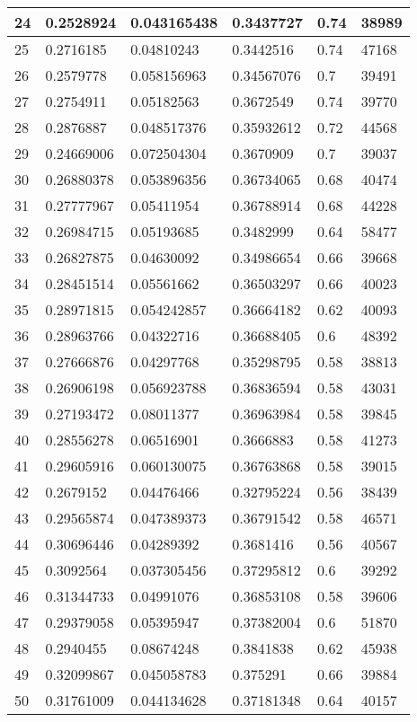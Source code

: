 \begin{longtable}{|l|l|l|l|l|l|}
24 & 0.2528924 & 0.043165438 & 0.3437727 & 0.74 & 38989 \\ \hline 
25 & 0.2716185 & 0.04810243 & 0.3442516 & 0.74 & 47168 \\ \hline 
26 & 0.2579778 & 0.058156963 & 0.34567076 & 0.7 & 39491 \\ \hline 
27 & 0.2754911 & 0.05182563 & 0.3672549 & 0.74 & 39770 \\ \hline 
28 & 0.2876887 & 0.048517376 & 0.35932612 & 0.72 & 44568 \\ \hline 
29 & 0.24669006 & 0.072504304 & 0.3670909 & 0.7 & 39037 \\ \hline 
30 & 0.26880378 & 0.053896356 & 0.36734065 & 0.68 & 40474 \\ \hline 
31 & 0.27777967 & 0.05411954 & 0.36788914 & 0.68 & 44228 \\ \hline 
32 & 0.26984715 & 0.05193685 & 0.3482999 & 0.64 & 58477 \\ \hline 
33 & 0.26827875 & 0.04630092 & 0.34986654 & 0.66 & 39668 \\ \hline 
34 & 0.28451514 & 0.05561662 & 0.36503297 & 0.66 & 40023 \\ \hline 
35 & 0.28971815 & 0.054242857 & 0.36664182 & 0.62 & 40093 \\ \hline 
36 & 0.28963766 & 0.04322716 & 0.36688405 & 0.6 & 48392 \\ \hline 
37 & 0.27666876 & 0.04297768 & 0.35298795 & 0.58 & 38813 \\ \hline 
38 & 0.26906198 & 0.056923788 & 0.36836594 & 0.58 & 43031 \\ \hline 
39 & 0.27193472 & 0.08011377 & 0.36963984 & 0.58 & 39845 \\ \hline 
40 & 0.28556278 & 0.06516901 & 0.3666883 & 0.58 & 41273 \\ \hline 
41 & 0.29605916 & 0.060130075 & 0.36763868 & 0.58 & 39015 \\ \hline 
42 & 0.2679152 & 0.04476466 & 0.32795224 & 0.56 & 38439 \\ \hline 
43 & 0.29565874 & 0.047389373 & 0.36791542 & 0.58 & 46571 \\ \hline 
44 & 0.30696446 & 0.04289392 & 0.3681416 & 0.56 & 40567 \\ \hline 
45 & 0.3092564 & 0.037305456 & 0.37295812 & 0.6 & 39292 \\ \hline 
46 & 0.31344733 & 0.04991076 & 0.36853108 & 0.58 & 39606 \\ \hline 
47 & 0.29379058 & 0.05395947 & 0.37382004 & 0.6 & 51870 \\ \hline 
48 & 0.2940455 & 0.08674248 & 0.3841838 & 0.62 & 45938 \\ \hline 
49 & 0.32099867 & 0.045058783 & 0.375291 & 0.66 & 39884 \\ \hline 
50 & 0.31761009 & 0.044134628 & 0.37181348 & 0.64 & 40157 \\ \hline 
\end{longtable}